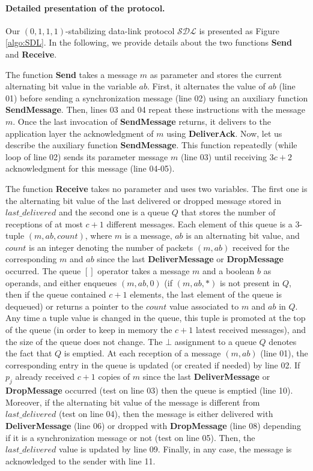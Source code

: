 \documentclass[11pt]{article}
\begin{document}
\paragraph{Detailed presentation of the protocol.}
Our $(0,1,1,1)$-stabilizing data-link protocol $\mathcal{SDL}$ is presented as Figure \ref{algo:SDL}. In the following, we provide details about the two functions \textbf{Send} and \textbf{Receive}.

The function \textbf{Send} takes a message $m$ as parameter and stores the current alternating bit value in the variable $ab$. First, it alternates the value of $ab$ (line 01) before sending a synchronization message (line 02) using an auxiliary function \textbf{SendMessage}. Then, lines 03 and 04 repeat these instructions with the message $m$. Once the last invocation of \textbf{SendMessage} returns, it delivers to the application layer the acknowledgment of $m$ using \textbf{DeliverAck}. Now, let us describe the auxiliary function \textbf{SendMessage}. This function repeatedly (while loop of line 02) sends its parameter message $m$ (line 03) until receiving $3c+2$ acknowledgment for this message (line 04-05).

The function \textbf{Receive} takes no parameter and uses two variables. The first one is the alternating bit value of the last delivered or dropped message stored in $last\_delivered$ and the second one is a queue $Q$ that stores the number of receptions of at most $c+1$ different messages. Each element of this queue is a  $3$-tuple $(m,ab,count)$, where $m$ is a message, $ab$ is an alternating bit value, and $count$ is an integer denoting the number of packets $(m,ab)$ received for the corresponding $m$ and $ab$ since the last \textbf{DeliverMessage} or \textbf{DropMessage} occurred. The queue $[]$ operator takes a message $m$ and a boolean $b$ as operands, and either enqueues $(m,ab,0)$ (if $(m,ab,*)$ is not present in $Q$, then if the queue contained $c+1$ elements, the last element of the queue is dequeued) or returns a pointer to the $count$ value associated to $m$ and $ab$ in $Q$. Any time a tuple value is changed in the queue, this tuple is promoted at the top of the queue (in order to keep in memory the $c+1$ latest received messages), and the size of the queue does not change. The $\bot$ assignment to a queue $Q$ denotes the fact that $Q$ is emptied. At each reception of a message $(m,ab)$ (line 01), the corresponding entry in the queue is updated (or created if needed) by line 02. If $p_j$ already received $c+1$ copies of $m$ since the last \textbf{DeliverMessage} or \textbf{DropMessage} occurred (test on line 03) then the queue is emptied (line 10). Moreover, if the alternating bit value of the message is different from $last\_delivered$ (test on line 04), then the message is either delivered with \textbf{DeliverMessage} (line 06) or dropped with \textbf{DropMessage} (line 08) depending if it is a synchronization message or not (test on line 05). Then, the $last\_delivered$ value is updated by line 09. Finally, in any case, the message is acknowledged to the sender with line 11.
\end{document}

